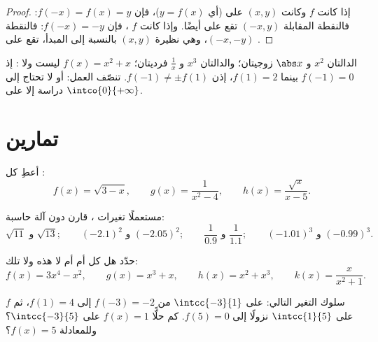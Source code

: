 \begin{proof}
إذا كانت $f$  وكانت $(x, y)$ على  (أي $y = f(x)$)، فإن
$f(-x) = f(x) = y$: فالنقطة المقابلة $(-x, y)$ تقع على  أيضًا. وإذا كانت
$f$ ، فإن $f(-x) = -y$: فالنقطة $(-x, -y)$، وهي نظيرة $(x,y)$ بالنسبة إلى
المبدأ، تقع على .
\end{proof}

\begin{example}
الدالتان $x^2$ و $\abs x$ زوجيتان؛ والدالتان $x^3$ و $\frac1x$ فرديتان؛
 $f(x) = x^2 + x$ ليست  ولا : إذ $f(-1) = 0$ بينما $f(1) = 2$، إذن
$f(-1) \neq \pm f(1)$.  تنصّف العمل:  أو 
لا تحتاج إلى دراسة إلا على $\intco{0}{+\infty}$.
\end{example}

\section{تمارين}

\begin{exercise}[$\star$]\label{exo:g11:func:1}
أعطِ  كل :
\[
f(x) = \sqrt{3 - x}, \qquad
g(x) = \frac{1}{x^2 - 4}, \qquad
h(x) = \frac{\sqrt{x}}{x - 5} .
\]
\end{exercise}

\begin{exercise}[$\star$]\label{exo:g11:func:2}
مستعملًا تغيرات ، قارن دون آلة
حاسبة:
\[
\sqrt{11} \text{ و } \sqrt{13}; \qquad
(-2.1)^2 \text{ و } (-2.05)^2; \qquad
\frac{1}{0.9} \text{ و } \frac{1}{1.1}; \qquad
(-1.01)^3 \text{ و } (-0.99)^3 .
\]
\end{exercise}

\begin{exercise}[$\star$]\label{exo:g11:func:3}
حدّد هل كل  أم  أم لا هذه ولا تلك:
\[
f(x) = 3x^4 - x^2, \qquad
g(x) = x^3 + x, \qquad
h(x) = x^2 + x^3, \qquad
k(x) = \frac{x}{x^2+1} .
\]
\end{exercise}

\begin{exercise}[$\star$]\label{exo:g11:func:4}
 $f$ سلوك التغير التالي:  على
$\intcc{-3}{1}$ من $f(-3) = -2$ إلى $f(1) = 4$، ثم  على
$\intcc{1}{5}$ نزولًا إلى $f(5) = 0$. كم حلًّا 
$f(x) = 1$ على $\intcc{-3}{5}$؟ وللمعادلة $f(x) = 5$؟
\end{exercise}

